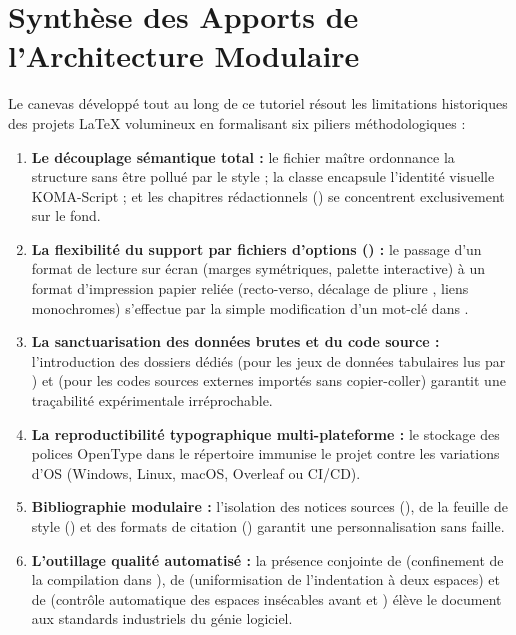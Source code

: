 \section{Synthèse des Apports de l'Architecture Modulaire}
\label{sec:conclusion-synthese}

Le canevas développé tout au long de ce tutoriel résout les limitations historiques
des projets \LaTeX{} volumineux en formalisant six piliers méthodologiques :

\begin{enumerate}
  \item \textbf{Le découplage sémantique total :}
  le fichier maître  ordonnance la structure sans être pollué par le style ;
  la classe  encapsule l'identité visuelle KOMA-Script ;
  et les chapitres rédactionnels () se concentrent exclusivement sur le fond.
  \item \textbf{La flexibilité du support par fichiers d'options () :}
  le passage d'un format de lecture sur écran (marges symétriques, palette interactive)
  à un format d'impression papier reliée (recto-verso, décalage de pliure , liens monochromes)
  s'effectue par la simple modification d'un mot-clé dans .
  \item \textbf{La sanctuarisation des données brutes et du code source :}
  l'introduction des dossiers dédiés  (pour les jeux de données tabulaires  lus par )
  et  (pour les codes sources externes importés sans copier-coller)
  garantit une traçabilité expérimentale irréprochable.
  \item \textbf{La reproductibilité typographique multi-plateforme :}
  le stockage des polices OpenType dans le répertoire 
  immunise le projet contre les variations d'OS (Windows, Linux, macOS, Overleaf ou CI/CD).
  \item \textbf{Bibliographie modulaire :}
  l'isolation des notices sources (),
  de la feuille de style ()
  et des formats de citation ()
  garantit une personnalisation sans faille.
  \item \textbf{L'outillage qualité automatisé :}
  la présence conjointe de  (confinement de la compilation dans ),
  de  (uniformisation de l'indentation à deux espaces)
  et de  (contrôle automatique des espaces insécables avant  et )
  élève le document aux standards industriels du génie logiciel.
\end{enumerate}

